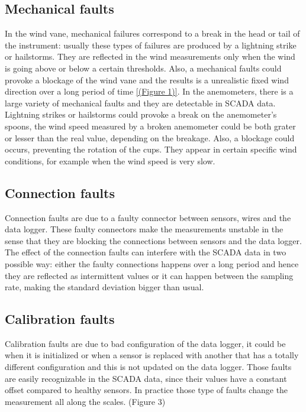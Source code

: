\documentclass[journal]{IEEEtran}
\begin{document}
\subsection{Mechanical faults}
In the wind vane, mechanical failures correspond to a break in the head or tail of the instrument: usually these types of failures are produced by a lightning strike or hailstorms. They are reflected in the wind measurements only when the wind is going above or below a certain thresholds. Also, a mechanical faults could provoke a blockage of the wind vane and the results is a unrealistic fixed wind direction over a long period of time \ref{(Figure 1)}.
In the anemometers, there is a large variety of mechanical faults and they are detectable in SCADA data. Lightning strikes or hailstorms could provoke a break on the anemometer's spoons, the wind speed measured by a broken anemometer could be both grater or lesser than the real value, depending on the breakage. Also, a blockage could occurs, preventing the rotation of the cups. They appear in certain specific wind conditions, for example when the wind speed is very slow.

\subsection{Connection  faults}
Connection faults are due to a faulty connector between sensors, wires and the data logger. These faulty connectors make the measurements unstable in the sense that they are blocking the connections between sensors and the data logger. The effect of the connection faults can interfere with the SCADA data in two possible way: either the faulty connections happens over a long period and hence they are reflected as intermittent values or it can happen between the sampling rate, making the standard deviation bigger than usual. %
\subsection{Calibration faults} 
Calibration faults are due to bad configuration of the data logger, it could be when it is initialized or when a sensor is replaced with another that has a totally different configuration and this is not updated on the data logger. Those faults are easily recognizable in the SCADA data, since their values have a constant offset compared to healthy sensors. In practice those type of faults change the measurement all along the scales. (Figure 3)
\end{document}
